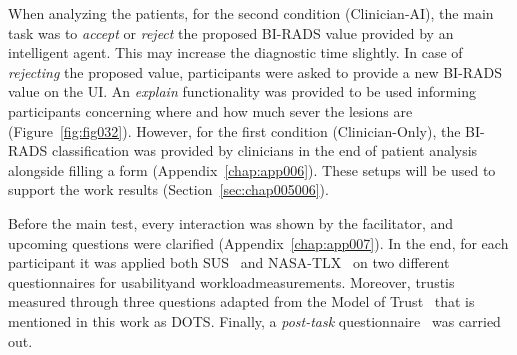 When analyzing the patients, for the second condition (Clinician-AI), the main task was to {\it accept} or {\it reject} the proposed \ac{BI-RADS} value provided by an intelligent agent.
This may increase the diagnostic time slightly.
In case of {\it rejecting} the proposed value, participants were asked to provide a new \ac{BI-RADS} value on the \ac{UI}.
An {\it explain} functionality was provided to be used informing participants concerning where and how much sever the lesions are (Figure~\ref{fig:fig032}).
However, for the first condition (Clinician-Only), the \ac{BI-RADS} classification was provided by clinicians in the end of patient analysis alongside filling a form (Appendix~\ref{chap:app006}).
These setups will be used to support the work results (Section~\ref{sec:chap005006}).

Before the main test, every interaction was shown by the facilitator, and upcoming questions were clarified (Appendix~\ref{chap:app007}).
In the end, for each participant it was applied both \ac{SUS}~\cite{Tyllinen:2016:WNN:2858036.2858570} and \ac{NASA-TLX}~\cite{10.1145/3399715.3399744} on two different questionnaires for usability\footnotemark[10] and workload\footnotemark[11] measurements.
Moreover, trust\footnotemark[12] is measured through three questions adapted from the Model of Trust~\cite{CALISTO2021102607} that is mentioned in this work as \ac{DOTS}.
Finally, a {\it post-task} questionnaire~\cite{10.1145/3132272.3134111} was carried out.




